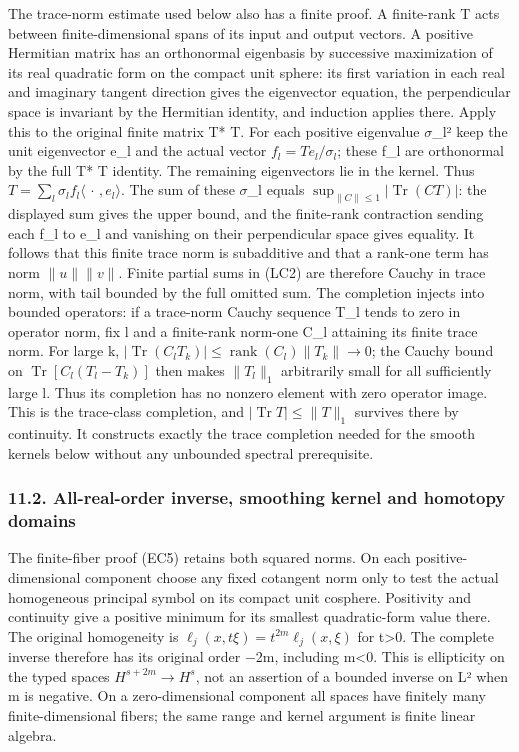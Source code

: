 \documentclass[
  11pt,
]{article}
\begin{document}
The trace-norm estimate used below also has a finite proof. A
finite-rank T acts between finite-dimensional spans of its input and
output vectors. A positive Hermitian matrix has an orthonormal
eigenbasis by successive maximization of its real quadratic form on the
compact unit sphere: its first variation in each real and imaginary
tangent direction gives the eigenvector equation, the perpendicular
space is invariant by the Hermitian identity, and induction applies
there. Apply this to the original finite matrix T* T. For each positive
eigenvalue \ensuremath{\sigma}\_l² keep the unit eigenvector e\_l and the actual vector
\(f_l=Te_l/\sigma_l\); these f\_l are orthonormal by the full T* T
identity. The remaining eigenvectors lie in the kernel. Thus
\(T=\sum_l\sigma_l f_l\langle\,\cdot\,,e_l\rangle\). The sum of these
\ensuremath{\sigma}\_l equals \(\sup_{\|C\|\leq1}|\operatorname{Tr}(CT)|\): the displayed
sum gives the upper bound, and the finite-rank contraction sending each
f\_l to e\_l and vanishing on their perpendicular space gives equality.
It follows that this finite trace norm is subadditive and that a
rank-one term has norm \(\|u\|\|v\|\). Finite partial sums in (LC2) are
therefore Cauchy in trace norm, with tail bounded by the full omitted
sum. The completion injects into bounded operators: if a trace-norm
Cauchy sequence T\_l tends to zero in operator norm, fix l and a
finite-rank norm-one C\_l attaining its finite trace norm. For large k,
\(|\operatorname{Tr}(C_lT_k)|\leq\operatorname{rank}(C_l)\|T_k\|\to0\);
the Cauchy bound on \(\operatorname{Tr}[C_l(T_l-T_k)]\) then makes
\(\|T_l\|_1\) arbitrarily small for all sufficiently large l. Thus its
completion has no nonzero element with zero operator image. This is the
trace-class completion, and \(|\operatorname{Tr}T|\leq\|T\|_1\) survives
there by continuity. It constructs exactly the trace completion needed
for the smooth kernels below without any unbounded spectral
prerequisite.

\subsubsection{11.2. All-real-order inverse, smoothing kernel and
homotopy
domains}\label{all-real-order-inverse-smoothing-kernel-and-homotopy-domains}

The finite-fiber proof (EC5) retains both squared norms. On each
positive-dimensional component choose any fixed cotangent norm only to
test the actual homogeneous principal symbol on its compact unit
cosphere. Positivity and continuity give a positive minimum for its
smallest quadratic-form value there. The original homogeneity is
\(\ell_j(x,t\xi)=t^{2m}\ell_j(x,\xi)\) for t\textgreater0. The complete
inverse therefore has its original order −2m, including m\textless0.
This is ellipticity on the typed spaces \(H^{s+2m}\to H^s\), not an
assertion of a bounded inverse on L² when m is negative. On a
zero-dimensional component all spaces have finitely many
finite-dimensional fibers; the same range and kernel argument is finite
linear algebra.
\end{document}
